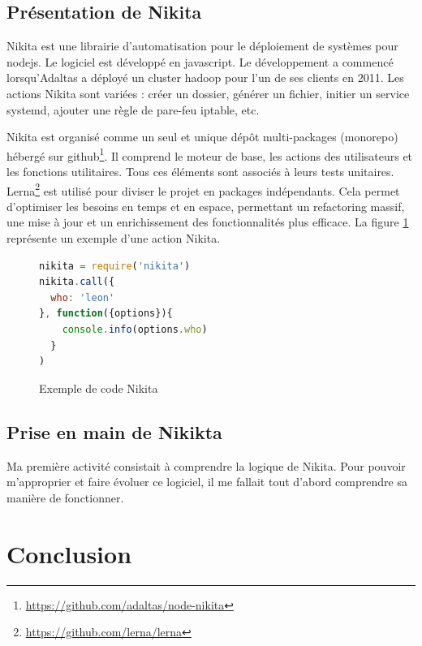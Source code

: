 \documentclass[12pt, french]{report}
\begin{document}
\section{Présentation de Nikita}

Nikita est une librairie d’automatisation pour le déploiement de systèmes pour \gls{nodejs}. Le logiciel est développé en \gls{javascript}. Le développement a commencé lorsqu'Adaltas a déployé un cluster \gls{hadoop} pour l’un de ses clients en 2011. Les actions Nikita sont variées : créer un dossier, générer un fichier, initier un service systemd, ajouter une règle de pare-feu iptable, etc.

Nikita est organisé comme un seul et unique dépôt multi-packages (monorepo) hébergé sur \gls{github}\footnote{\href{https://github.com/adaltas/node-nikita}{https://github.com/adaltas/node-nikita}}. Il comprend le moteur de base, les actions des utilisateurs et les fonctions utilitaires. Tous ces éléments sont associés à leurs tests unitaires. Lerna\footnote{\href{https://github.com/lerna/lerna}{https://github.com/lerna/lerna}} est utilisé pour diviser le projet en packages indépendants. Cela permet d'optimiser les besoins en temps et en espace, permettant un refactoring massif, une mise à jour et un enrichissement des fonctionnalités plus efficace. La figure \ref{code:example} représente un exemple d'une action Nikita.

\begin{figure}[H]
\begin{lstlisting}[language=JavaScript]
nikita = require('nikita')
nikita.call({
  who: 'leon'
}, function({options}){
    console.info(options.who)
  }
)
\end{lstlisting}
\centering
\caption{Exemple de code Nikita}
\label{code:example}
\end{figure}

\section{Prise en main de Nikikta}

Ma première activité consistait à comprendre la logique de Nikita. Pour pouvoir m'approprier et faire évoluer ce logiciel, il me fallait tout d'abord comprendre sa manière de fonctionner.

\chapter*{Conclusion}
\end{document}
